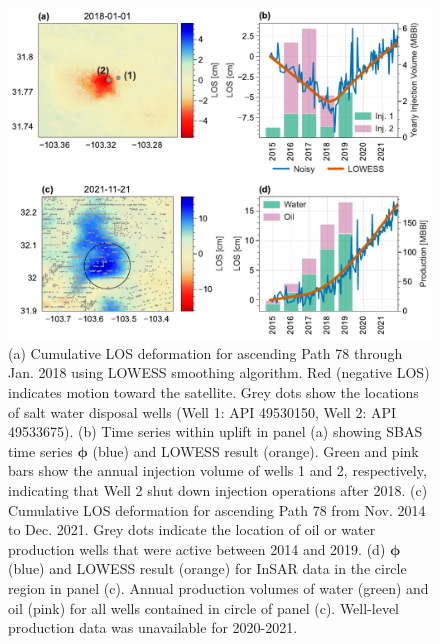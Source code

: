 \begin{figure}[!ht]
	\centering
	\includegraphics[width=.9\textwidth]{figures/chapter5-lowess/figure-results-path78-examples.pdf}
	\caption[Path 78 deformation features]{
		(a) Cumulative LOS deformation for ascending Path 78 through Jan. 2018 using LOWESS smoothing algorithm. Red (negative LOS) indicates motion toward the satellite. 
		Grey dots show the locations of salt water disposal wells (Well 1: API 49530150, Well 2: API 49533675).
		(b) Time series within uplift in panel (a) showing SBAS time series $ \bm{\phi} $ (blue) and LOWESS result (orange). Green and pink bars show the annual injection volume of wells 1 and 2, respectively, indicating that Well 2 shut down injection operations after 2018.
		(c) Cumulative LOS deformation for ascending Path 78 from Nov. 2014 to Dec. 2021. Grey dots indicate the location of oil or water production wells that were active between 2014 and 2019.
		(d) $ \bm{\phi} $ (blue) and LOWESS result (orange) for InSAR data in the circle region in panel (c).
		Annual production volumes of water (green) and oil (pink) for all wells contained in circle of panel (c). Well-level production data was unavailable for 2020-2021.
	}
	\label{fig:ch5-results-path78-examples}
\end{figure}



%


